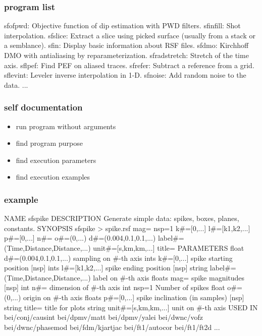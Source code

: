 \begin{frame}[fragile] \frametitle{program list}
  \tiny
  \begin{semiverbatim}
    sfofpwd: Objective function of dip estimation with PWD filters.
    sfinfill: Shot interpolation.
    sfslice: Extract a slice using picked surface (usually from a stack or a semblance).
    sfin: Display basic information about RSF files.
    sfdmo: Kirchhoff DMO with antialiasing by reparameterization.
    sfradstretch: Stretch of the time axis.
    sflpef: Find PEF on aliased traces.
    sfrefer: Subtract a reference from a grid.
    sflevint: Leveler inverse interpolation in 1-D.
    sfnoise: Add random noise to the data.
    ...
  \end{semiverbatim}

\end{frame}
\cwpnote{}

\begin{frame} \frametitle{self documentation}

  \begin{itemize}
  \item run program without arguments
  \item find program purpose
  \item find execution parameters
  \item find execution examples
  \end{itemize}
  
\end{frame}
\cwpnote{}

\begin{frame}[fragile] \frametitle{example}
\tiny
\begin{semiverbatim}
NAME
        sfspike
DESCRIPTION
        Generate simple data: spikes, boxes, planes, constants.
SYNOPSIS
        sfspike > spike.rsf mag= nsp=1 k#=[0,...] l#=[k1,k2,...] p#=[0,...] n#=
o#=(0,...) d#=(0.004,0.1,0.1,...) label#=(Time,Distance,Distance,...) unit#=[s,km,km,...] title=
PARAMETERS
        float   d#=(0.004,0.1,0.1,...)  sampling on #-th axis
        ints    k#=[0,...]      spike starting position  [nsp]
        ints    l#=[k1,k2,...]  spike ending position  [nsp]
        string  label#=(Time,Distance,Distance,...)     label on #-th axis
        floats  mag=    spike magnitudes  [nsp]
        int     n#=     dimension of #-th axis
        int     nsp=1   Number of spikes
        float   o#=(0,...)      origin on #-th axis
        floats  p#=[0,...]      spike inclination (in samples)  [nsp]
        string  title=  title for plots
        string  unit#=[s,km,km,...]     unit on #-th axis
USED IN
        bei/conj/causint
        bei/dpmv/matt
        bei/dpmv/yalei
        bei/dwnc/vofz
        bei/dwnc/phasemod
        bei/fdm/kjartjac
        bei/ft1/autocor
        bei/ft1/ft2d
	...
\end{semiverbatim}
\end{frame}
\cwpnote{}

